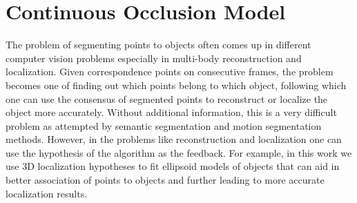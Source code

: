 \section{Continuous Occlusion Model}
\label{sec:setup}
The problem of segmenting points to objects often comes up in different
computer vision problems especially in multi-body 
reconstruction and localization. Given correspondence points on
consecutive frames, the problem becomes one of finding out which points belong
to which object, following which one can use the consensus of segmented points
to reconstruct or localize the object more accurately. Without additional 
information, this is a very difficult problem as attempted by semantic segmentation 
and motion segmentation methods. However, in the problems like reconstruction and
localization one can use the hypothesis of the algorithm as the feedback. For
example, in this work we use 3D localization hypotheses to fit ellipsoid
models of objects that can aid in better association of points to objects and
further leading to more accurate localization results.
